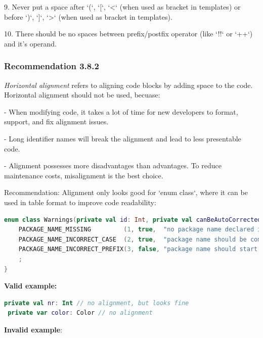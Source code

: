 {{{{9. Never put a space after `(`, `[`, `<` (when used as bracket in templates) or before `)`, `]`, `>` (when used as bracket in templates).



10. There should be no spaces between prefix/postfix operator (like `!!` or `++`) and it's operand.



\subsubsection*{\textbf{Recommendation 3.8.2}}
\leavevmode\newline



\textit{Horizontal alignment} refers to aligning code blocks by adding space to the code. Horizontal alignment should not be used, becuase:



- When modifying code, it takes a lot of time for new developers to format, support, and fix alignment issues.

- Long identifier names will break the alignment and lead to less presentable code.

- Alignment possesses more disadvantages than advantages. To reduce maintenance costs, misalignment is the best choice.



Recommendation: Alignment only looks good for `enum class`, where it can be used in table format to improve code readability:

\begin{lstlisting}[language=Kotlin]
enum class Warnings(private val id: Int, private val canBeAutoCorrected: Boolean, private val warn: String) : Rule {
    PACKAGE_NAME_MISSING         (1, true,  "no package name declared in a file"),
    PACKAGE_NAME_INCORRECT_CASE  (2, true,  "package name should be completely in a lower case"),
    PACKAGE_NAME_INCORRECT_PREFIX(3, false, "package name should start from company's domain")
    ;
}
\end{lstlisting}


\textbf{Valid example:}

\begin{lstlisting}[language=Kotlin]
 private val nr: Int // no alignment, but looks fine
 private var color: Color // no alignment
\end{lstlisting}


\textbf{Invalid example}:

}}}}
